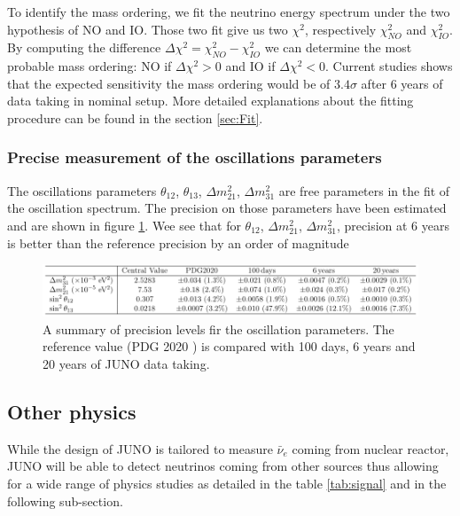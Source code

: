 To identify the mass ordering, we fit the neutrino energy spectrum under the two hypothesis of NO and IO. Those two fit give us two $\chi^2$, respectively $\chi^2_{NO}$ and $\chi^2_{IO}$. By computing the difference $\Delta \chi ^2 = \chi^2_{NO} - \chi^2_{IO}$ we can determine the most probable mass ordering: NO if $\Delta \chi^2 > 0$ and IO if $\Delta \chi^2 < 0$. Current studies shows that the expected sensitivity the mass ordering would be of $3.4 \sigma$ after 6 years of data taking in nominal setup\cite{an_neutrino_2016}. More detailed explanations about the fitting procedure can be found in the section \ref{sec:Fit}.

\subsubsection{Precise measurement of the oscillations parameters}

The oscillations parameters $\theta_{12}$, $\theta_{13}$, $\Delta m^2_{21}$, $\Delta m^2_{31}$ are free parameters in the fit of the oscillation spectrum. The precision on those parameters have been estimated and are shown in figure \ref{fig:juno-param-precision}. Wee see that for $\theta_{12}$, $\Delta m^2_{21}$, $\Delta m^2_{31}$, precision at 6 years is better than the reference precision by an order of magnitude \cite{juno_collaboration_sub-percent_2022}

\begin{figure}[hb]
  \centering
  \includegraphics[width=\linewidth]{images/juno/oscillation_params_precision.png}
  \caption{A summary of precision levels fir the oscillation parameters. The reference value (PDG 2020 \cite{particle_data_group_review_2020}) is compared with 100 days, 6 years and 20 years of JUNO data taking.}
  \label{fig:juno-param-precision}
\end{figure}

\subsection{Other physics}

While the design of JUNO is tailored to measure $\bar{\nu}_e$ coming from nuclear reactor, JUNO will be able to detect neutrinos coming from other sources thus allowing for a wide range of physics studies as detailed in the table \ref{tab:signal} and in the following sub-section.

